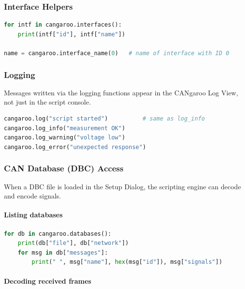 \documentclass[a4paper,11pt]{article}
\begin{document}
\subsubsection{Interface Helpers}

\begin{lstlisting}[language=Python, caption={List all active interfaces}]
for intf in cangaroo.interfaces():
    print(intf["id"], intf["name"])

name = cangaroo.interface_name(0)   # name of interface with ID 0
\end{lstlisting}

\subsubsection{Logging}

Messages written via the logging functions appear in the CANgaroo Log View, not
just in the script console.

\begin{lstlisting}[language=Python]
cangaroo.log("script started")          # same as log_info
cangaroo.log_info("measurement OK")
cangaroo.log_warning("voltage low")
cangaroo.log_error("unexpected response")
\end{lstlisting}

\subsubsection{CAN Database (DBC) Access}

When a DBC file is loaded in the Setup Dialog, the scripting engine can decode and
encode signals.

\paragraph{Listing databases}

\begin{lstlisting}[language=Python]
for db in cangaroo.databases():
    print(db["file"], db["network"])
    for msg in db["messages"]:
        print(" ", msg["name"], hex(msg["id"]), msg["signals"])
\end{lstlisting}

\paragraph{Decoding received frames}
\end{document}
